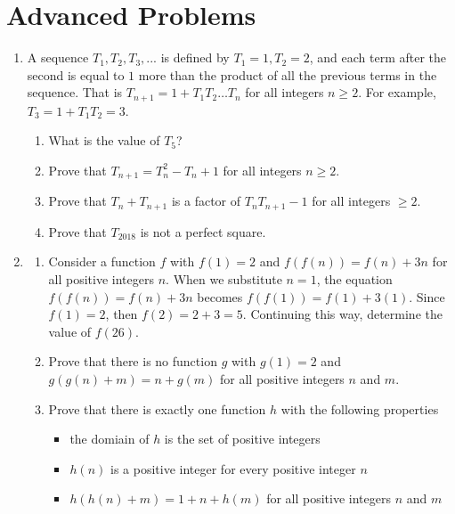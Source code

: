 \documentclass[12pt]{article}
\begin{document}
\section*{Advanced Problems}
\begin{enumerate}
    \item A sequence $T_1, T_2, T_3, ...$ is defined by $T_1 = 1, T_2 = 2$, and each term after the second is equal to $1$ more than the product of all the previous terms in the sequence. That is $T_{n + 1} = 1 + T_1T_2 \dots T_n$ for all integers $n \geq 2$. For example, $T_3 = 1 + T_1T_2 = 3$.
    \begin{enumerate}
        \item What is the value of $T_5$?
        \item Prove that $T_{n + 1} = T_n^2 - T_n + 1$ for all integers $n \geq 2$.
        \item Prove that $T_n + T_{n + 1}$ is a factor of $T_nT_{n + 1} - 1$ for all integers $\geq 2$.
        \item Prove that $T_{2018}$ is not a perfect square.
    \end{enumerate} \newpage

    \item 
    \begin{enumerate}
        \item Consider a function $f$ with $f(1) = 2$ and $f(f(n)) = f(n) + 3n$ for all positive integers $n$. When we substitute $n = 1$, the equation $f(f(n)) = f(n) + 3n$ becomes $f(f(1)) = f(1) + 3(1)$. Since $f(1) = 2$, then $f(2) = 2 + 3 = 5$. Continuing this way, determine the value of $f(26)$.
        
        \item Prove that there is no function $g$ with $g(1) = 2$ and $g(g(n) + m) = n + g(m)$ for all positive integers $n$ and $m$.
        
        \item Prove that there is exactly one function $h$ with the following properties
        \begin{itemize}
            \item the domiain of $h$ is the set of positive integers
            \item $h(n)$ is a positive integer for every positive integer $n$
            \item $h(h(n) + m) = 1 + n + h(m)$ for all positive integers $n$ and $m$
        \end{itemize}
    \end{enumerate}
\end{enumerate}
\end{document}

